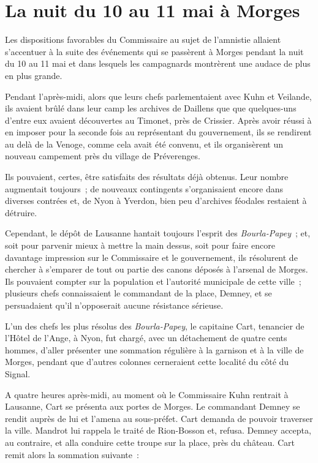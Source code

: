 \documentclass[french,twoside]{book} %
\begin{document}
\section[La nuit du 10 au 11 mai à Morges]{La nuit du 10 au 11 mai à Morges}
\noindent Les dispositions favorables du Commissaire au sujet de l’amnistie allaient s’accentuer à la suite des événements qui se passèrent à Morges pendant la nuit du 10 au 11 mai et dans lesquels les campagnards montrèrent une audace de plus en plus grande.\par
Pendant l’après-midi, alors que leurs chefs parlementaient avec Kuhn et Veilande, ils avaient brûlé dans leur camp les archives de Daillens que que quelques-uns d’entre eux avaient découvertes au Timonet, près de Crissier. Après avoir réussi à en imposer pour la seconde fois au représentant du gouvernement, ils se rendirent au delà de la Venoge, comme cela avait été convenu, et ils organisèrent un nouveau campement près du village de Préverenges.\par
Ils pouvaient, certes, être satisfaits des résultats déjà obtenus. Leur nombre augmentait toujours ; de nouveaux contingents s’organisaient encore dans diverses contrées et, de Nyon à Yverdon, bien peu d’archives féodales restaient à détruire.\par
Cependant, le dépôt de Lausanne hantait toujours l’esprit des \emph{Bourla-Papey} ; et, soit pour parvenir mieux à mettre la main dessus, soit pour faire encore davantage impression sur le Commissaire et le gouvernement, ils résolurent de chercher à s’emparer de tout ou partie des canons déposés à l’arsenal de Morges. Ils pouvaient compter sur la population et l’autorité municipale de cette ville ; plusieurs chefs connaissaient le commandant de la place, Demney, et se persuadaient qu’il n’opposerait aucune résistance sérieuse.\par
L’un des chefs les plus résolus des \emph{Bourla-Papey}, le capitaine Cart, tenancier de l’Hôtel de l’Ange, à Nyon, fut chargé, avec un détachement de quatre cents hommes, d’aller présenter une sommation régulière à la garnison et à la ville de Morges, pendant que d’autres colonnes cerneraient cette localité du côté du Signal.\par
A quatre heures après-midi, au moment où le Commissaire Kuhn rentrait à Lausanne, Cart se présenta aux portes de Morges. Le commandant Demney se rendit auprès de lui et l’amena au sous-préfet. Cart demanda de pouvoir traverser la ville. Mandrot lui rappela le traité de Rion-Bosson et, refusa. Demney accepta, au contraire, et alla conduire cette troupe sur la place, près du château. Cart remit alors la sommation suivante :\par
\end{document}
